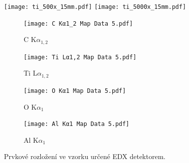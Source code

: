 \documentclass[a4paper,12pt]{article}
\begin{document}
\begin{figure}[h!]
	\centering
	\texttt{[image: ti\_500x\_15mm.pdf]}
	\texttt{[image: ti\_5000x\_15mm.pdf]}
	\caption{\centering }
	\label{fig:ti5000}
\end{figure}



\begin{figure}[h!]
	\centering
	\begin{subfigure}{0.49\textwidth}
		\texttt{[image: C Kα1\_2 Map Data 5.pdf]}
		\caption{\centering C K$\alpha_{1,2}$}
		\label{fig:EDX_C}
	\end{subfigure}
	\begin{subfigure}{0.49\textwidth}
		\texttt{[image: Ti Lα1,2 Map Data 5.pdf]}
		\caption{\centering Ti L$\alpha_{1,2}$}
		\label{fig:EDX_Ti}
	\end{subfigure}
	\begin{subfigure}{0.49\textwidth}
		\texttt{[image: O Kα1 Map Data 5.pdf]}
		\caption{\centering O K$\alpha_{1}$}
		\label{fig:EDX_O}
	\end{subfigure}
	\begin{subfigure}{0.49\textwidth}
		\texttt{[image: Al Kα1 Map Data 5.pdf]}
		\caption{\centering Al K$\alpha_{1}$}
		\label{fig:EDX_Al}
	\end{subfigure}
	\label{fig:EDX}
	\caption{Prvkové rozložení ve vzorku určené EDX detektorem.}
\end{figure}
\end{document}
